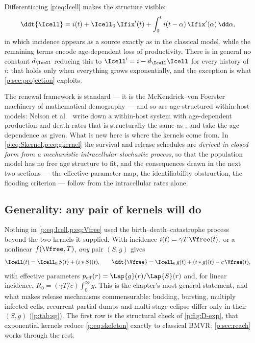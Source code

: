 Differentiating \cref{p:eq:Icell} makes the structure visible:
\begin{equation}
\ddt{\Icell}
= i(t)+\Icell_0\,\Ifix'(t)+\int_0^t i(t-\alpha)\,\Ifix'(\alpha)\,\dd\alpha,
\label{p:eq:Icell-diff}
\end{equation}
in which incidence appears as a source exactly as in the classical model,
while the remaining terms encode age-dependent loss of productivity. There
is in general no constant $d_{\Icell}$ reducing this to
$\Icell'=i-d_{\Icell}\Icell$ for every history of $i$: that holds only when
everything grows exponentially, and the exception is what
\cref{p:sec:projection} exploits.

\begin{remark}
\label{p:rem:novelty}
The renewal framework is standard --- it is the McKendrick--von Foerster
machinery of mathematical demography
\cite{mckendrick1926applications,vonfoerster1959some,metz1986dynamics} ---
and so are age-structured within-host models: Nelson et al.\
\cite{nelson2004agestructured} write down a within-host system with
age-dependent production and death rates that is structurally the same as
\crefrange{p:eq:Icell}{p:eq:Vfree}, and take the age dependence as given.
What is new here is where the kernels come from. In
\cref{p:eq:Skernel,p:eq:gkernel} the survival and release schedules are
\emph{derived in closed form from a mechanistic intracellular stochastic
process}, so that the population model has no free age structure to fit, and
the consequences drawn in the next two sections --- the effective-parameter
map, the identifiability obstruction, the flooding criterion --- follow from
the intracellular rates alone.
\end{remark}

\subsection{Generality: any pair of kernels will do}
\label{p:sec:generality}

Nothing in \cref{p:eq:Icell,p:eq:Vfree} used the birth--death--catastrophe
process beyond the two kernels it supplied. With incidence
$i(t)=\gamma T\,\Vfree(t)$, or a nonlinear $f(\Vfree,T)$, \emph{any} pair
$(S,g)$ gives
\begin{equation}
\Icell(t)=\Icell_0\,S(t)+(i*S)(t),
\qquad
\ddt{\Vfree}=\Icell_0\,g(t)+(i*g)(t)-c\,\Vfree(t),
\label{p:eq:skeleton}
\end{equation}
with effective parameters $p_{\rm eff}(r)=\Lap{g}(r)/\Lap{S}(r)$ and, for
linear incidence, $R_0=(\gamma T/c)\int_0^\infty g$. This is the chapter's
most general statement, and what makes release mechanisms commensurable:
budding, bursting, multiply infected cells, recurrent partial dumps and
multi-stage eclipse differ only in their $(S,g)$ (\cref{p:tab:sg}). The
first row is the structural check of \cref{p:fig:D-exp}, that exponential
kernels reduce \cref{p:eq:skeleton} exactly to classical BMVR;
\cref{p:sec:reach} works through the rest.

